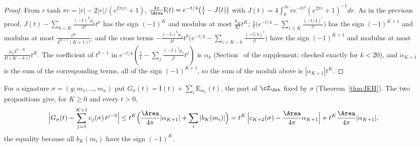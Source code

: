 \begin{proof}
From $r\tanh\pi r=|r|-2|r|/(e^{2\pi|r|}+1)$, $\frac{4\pi}{\Area}\mathrm I(t)=e^{-t/4}\big(\frac1t-J(t)\big)$ with $J(t)=4\int_0^\infty re^{-tr^2}(e^{2\pi r}+1)^{-1}dr$. As in the previous proof, $J(t)-\sum_{k<K}\frac{(-1)^k\mu_k}{k!}t^k$ has the sign $(-1)^K$ and modulus at most $\frac{\mu_K}{K!}t^K$; $\frac1t\big(e^{-t/4}-\sum_{i\le K}\frac{(-t/4)^i}{i!}\big)$ has the sign $(-1)^{K+1}$ and modulus at most $\frac{t^K}{4^{K+1}(K+1)!}$; and the cross terms $-\frac{(-1)^k\mu_k}{k!}t^k\big(e^{-t/4}-\sum_{i<K-k}\frac{(-t/4)^i}{i!}\big)$ have the sign $(-1)^{K+1}$ and modulus at most $\frac{\mu_k4^{k-K}}{k!(K-k)!}t^K$. The coefficient of $t^{k-1}$ in $e^{-t/4}(\frac1t-\sum_j\frac{(-1)^j\mu_j}{j!}t^j)$ is $\alpha_k$ (Section~ of the supplement; checked exactly for $k<20$), and $\alpha_{K+1}$ is the sum of the corresponding terms, all of the sign $(-1)^{K+1}$, so the sum of the moduli above is $|\alpha_{K+1}|t^K$.
\end{proof}

For a signature $\sigma=(g;m_1,\dots,m_n)$ put $G_\sigma(t)=\mathrm I(t)+\sum_i\mathrm E_{m_i}(t)$, the part of $\cZ_\Orb$ fixed by $\sigma$ (Theorem~\ref{thm:IEH}). The two propositions give, for $K\ge0$ and every $t>0$,
\begin{equation}\label{eig:Grem}
  \Big|G_\sigma(t)-\sum_{j=1}^{K+1}c_j(\sigma)\,t^{j-2}\Big|\le t^K\Big(\frac{\Area}{4\pi}|\alpha_{K+1}|+\sum_i|b_K(m_i)|\Big)=t^K\,\Big|c_{K+2}(\sigma)-\frac{\Area}{4\pi}\alpha_{K+1}\Big|+t^K\frac{\Area}{4\pi}|\alpha_{K+1}|,
\end{equation}
the equality because all $b_K(m_i)$ have the sign $(-1)^K$.
